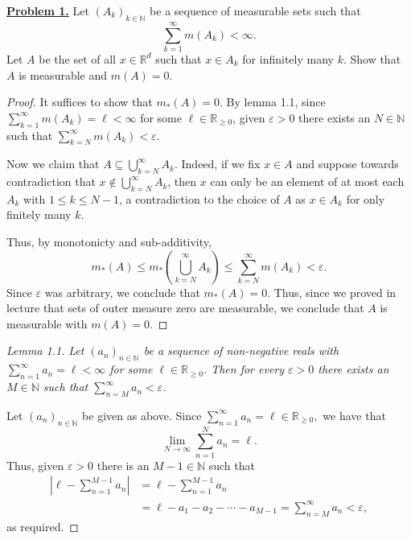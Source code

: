 \noindent \underline{\textbf{Problem 1.}} Let \( (A_k)_{k \in \mathbb{N} }  \) be a sequence of measurable sets such that \[\sum_{k=1}^{\infty}m(A_k) < \infty.\] Let \( A \) be the set of all \( x \in \mathbb{R}^{d}  \) such that \( x \in A_k \) for infinitely many \( k \). Show that \( A \) is measurable and \( m(A) = 0. \)   
\begin{proof}
It suffices to show that \( m_*(A) = 0. \) By lemma 1.1, since \( \sum_{k=1}^{\infty}m(A_k)  = \ell < \infty \) for some \( \ell \in \mathbb{R}_{\geq 0}  \), given \( \varepsilon > 0 \) there exists an \( N \in \mathbb{N}  \) such that \( \sum_{k=N}^{\infty} m(A_k) < \varepsilon . \)

Now we claim that \( A \subseteq \bigcup_{k=N}^{\infty} A_k. \) Indeed, if we fix \( x \in A \) and suppose towards contradiction that \( x \notin \bigcup_{k=N}^{\infty} A_k \), then \( x \) can only be an element of at most each \( A_k \) with \( 1 \leq k \leq N-1 \), a contradiction to the choice of \( A \) as \( x \in A_k \) for only finitely many \( k \).

Thus, by monotonicty and sub-additivity, \[m_*(A) \leq m_*\left ( {\bigcup_{k=N}^{\infty} A_k} \right ) \leq \sum_{k=N}^{\infty} m(A_k) < \varepsilon .  \] Since \( \varepsilon  \) was arbitrary, we conclude that \( m_*(A)  = 0 \). Thus, since we proved in lecture that sets of outer measure zero are measurable, we conclude that \( A \) is measurable with \( m(A) = 0. \) 





\end{proof}
\begin{proof}[Lemma 1.1] \emph{Let \( (a_n)_{n \in \mathbb{N} }  \) be a sequence of non-negative reals with \(\sum_{n=1}^{\infty}a_n = \ell < \infty\) for some \( \ell \in \mathbb{R}_{\geq 0}  \). Then for every \( \varepsilon > 0 \) there exists an \( M \in \mathbb{N}  \) such that \( \sum_{n=M}^{\infty}a_n < \varepsilon  \).}

	Let \( (a_n)_{n \in \mathbb{N} }  \) be given as above. Since \(\sum_{n=1}^{\infty}a_n = \ell \in \mathbb{R}_{\geq 0} ,\) we have that \[\lim_{{N} \to {\infty}} \sum_{n=1}^{N}a_n = \ell.\] Thus, given \( \varepsilon > 0 \) there is an \( M - 1 \in \mathbb{N}  \) such that
\begin{align*}
	\left | \ell - \sum_{n=1}^{M - 1}a_n \right | &= \ell - \sum_{n=1}^{M-1}a_n \tag{\(a_n \geq 0 \ \forall n \geq 1\) } \\ 
						      &= \ell - a_1 - a_2 - \cdots - a_{M-1} = \sum_{n=M}^{\infty}a_n < \varepsilon,
\end{align*}
as required.
\end{proof}
